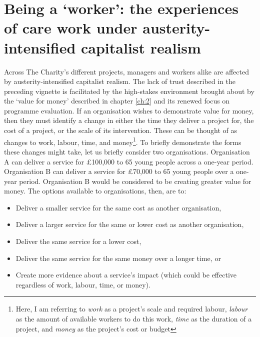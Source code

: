\section{Being a `worker': the experiences of care work under austerity-intensified capitalist realism}
Across The Charity's different projects, managers and workers alike are affected by austerity-intensified capitalist realism. The lack of trust described in the preceding vignette is facilitated by the high-stakes environment brought about by the ‘value for money’ described in chapter \ref{ch:2} and its renewed focus on programme evaluation. If an organisation wishes to demonstrate value for money, then they must identify a change in either the time they deliver a project for, the cost of a project, or the scale of its intervention. These can be thought of as changes to work, labour, time, and money\footnote{Here, I am referring to \textit{work} as a project's scale and required labour, \textit{labour} as the amount of available workers to do this work, \textit{time} as the duration of a project, and \textit{money} as the project's cost or budget}. To briefly demonstrate the forms these changes might take, let us briefly consider two organisations. Organisation A can deliver a service for £100,000 to 65 young people across a one-year period. Organisation B can deliver a service for £70,000 to 65 young people over a one-year period. Organisation B would be considered to be creating greater value for money. The options available to organisations, then, are to:
\begin{itemize}
\item Deliver a smaller service for the same cost as another organisation,
\item Deliver a larger service for the same or lower cost as another organisation,
\item Deliver the same service for a lower cost, 
\item Deliver the same service for the same money over a longer time, or
\item Create more evidence about a service's impact (which could be effective regardless of work, labour, time, or money).
\end{itemize}

